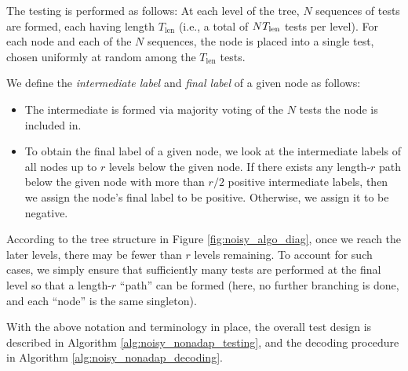 The testing is performed as follows: At each level of the tree, $N$ sequences of tests are formed, each having length $T_{\text{len}}$ (i.e., a total of $NT_{\rm len}$ tests per level).  For each node and each of the $N$ sequences, the node is placed into a single test, chosen uniformly at random among the $T_{\text{len}}$ tests.

We define the \textit{intermediate label} and \textit{final label} of a given node as follows:
\begin{itemize}
    \item The intermediate is formed via majority voting of the $N$ tests the node is included in.
    \item To obtain the final label of a given node, we look at the intermediate labels of all nodes up to $r$ levels below the given node. If there exists any length-$r$ path below the given node with more than $r/2$ positive intermediate labels, then we assign the node's final label to be positive. Otherwise, we assign it to be negative. 
\end{itemize}
According to the tree structure in Figure \ref{fig:noisy_algo_diag}, once we reach the later levels, there may be fewer than $r$ levels remaining.  To account for such cases, we simply ensure that sufficiently many tests are performed at the final level so that a length-$r$ ``path'' can be formed (here, no further branching is done, and each ``node'' is the same singleton).

With the above notation and terminology in place, the overall test design is described in Algorithm \ref{alg:noisy_nonadap_testing}, and the decoding procedure in Algorithm \ref{alg:noisy_nonadap_decoding}.


